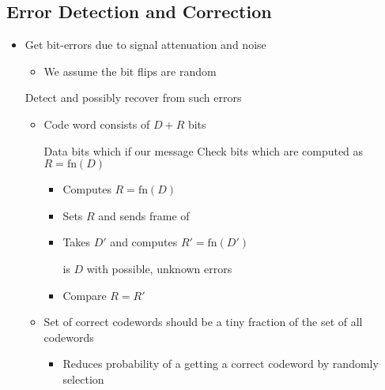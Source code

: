 \subsection{Error Detection and Correction}
\begin{itemize}
    \item Get bit-errors due to signal attenuation and noise
        \begin{itemize}
            \item We assume the bit flips are random
        \end{itemize}
     Detect and possibly recover from such errors
        \begin{itemize}
            \item Code word consists of $D + R$ bits
                \begin{itemize}
                     Data bits which if our message
                     Check bits which are computed as $R = \text{fn}(D)$
                \end{itemize}
                \begin{itemize}
                    \item Computes $R = \text{fn}(D)$
                    \item Sets $R$ and sends frame of
                \end{itemize}
                \begin{itemize}
                    \item Takes $D'$ and computes $R'= \text{fn}(D')$
                        \begin{itemize}
                             is $D$ with possible, unknown errors
                        \end{itemize}
                    \item Compare $R = R'$
                \end{itemize}
            \item Set of correct codewords should be a tiny fraction of the set of all codewords
                \begin{itemize}
                    \item Reduces probability of a getting a correct codeword by randomly selection
                \end{itemize}
        \end{itemize}
        \begin{itemize}

\end{itemize}
\end{itemize}
